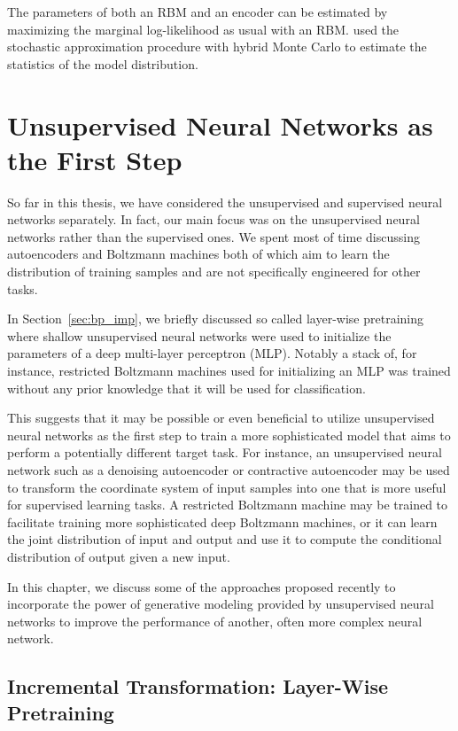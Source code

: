 \documentclass[dissertation,nocontribution,draft*]{aaltoseries}
\begin{document}
The parameters of both an RBM and an encoder can be
estimated by maximizing the marginal log-likelihood as usual
with an RBM. \citet{Ngiam2011} used the stochastic
approximation procedure with hybrid Monte Carlo
\citep{Neal1993} to estimate the statistics of the model
distribution.


\chapter{Unsupervised Neural Networks as the First Step}
\label{chap:pretraining}

So far in this thesis, we have considered the unsupervised
and supervised neural networks separately.  In fact, our
main focus was on the unsupervised neural networks rather
than the supervised ones. We spent most of time discussing
autoencoders and Boltzmann machines both of which aim to
learn the distribution of training samples and are not
specifically engineered for other tasks.

In Section~\ref{sec:bp_imp}, we briefly discussed so
called layer-wise pretraining where shallow
unsupervised neural networks were used to initialize the
parameters of a deep multi-layer perceptron (MLP). Notably
a stack of, for instance, restricted Boltzmann machines used
for initializing an MLP was trained without any prior
knowledge that it will be used for classification.

This suggests that it may be possible or even beneficial
to utilize unsupervised neural networks as the first step to
train a more sophisticated model that aims to perform a
potentially different target task. For instance, an
unsupervised neural network such as a denoising autoencoder
or contractive autoencoder may be used to transform the
coordinate system of input samples into one that is more
useful for supervised learning tasks. A restricted Boltzmann machine
may be trained to facilitate training more sophisticated
deep Boltzmann machines, or it can learn the joint
distribution of input and output and use it to compute the
conditional distribution of output given a new input.

In this chapter, we discuss some of the approaches proposed
recently to incorporate the power of generative modeling
provided by unsupervised neural networks to improve the
performance of another, often more complex neural network.  


\section{Incremental Transformation: Layer-Wise Pretraining}
\label{sec:layer_wise_pretraining}
\end{document}

